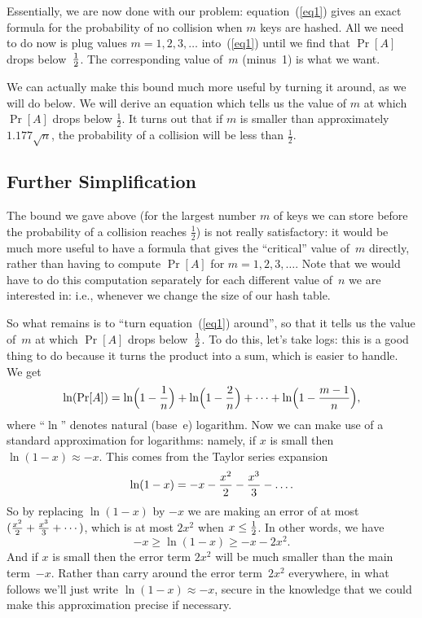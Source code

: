 \documentclass[11pt]{article}
\def\half{{\textstyle{1\over 2}}}
\begin{document}
Essentially, we are now done with our problem: equation~(\ref{eq1}) gives
an exact formula for the probability of no collision when $m$ keys
are hashed.  All we need to do now is plug values $m=1,2,3,\ldots$
into~(\ref{eq1}) until we find that $\Pr[A]$ drops below~$\half$.  The
corresponding value of~$m$ (minus~1) is what we want.  

We can actually make this bound much more useful by turning it around, as we will
do below. We will derive an equation which tells us the value of $m$ at which $\Pr[A]$ drops below
$\frac{1}{2}$. It turns out that if $m$ is smaller than approximately
$1.177\sqrt{n}$, the probability of a collision will be less than $\frac{1}{2}$. 

\subsection*{Further Simplification}
The bound we gave above (for the largest number $m$ of keys we can store
before the probability of a collision reaches $\frac{1}{2}$) is not really satisfactory: it would be much more useful to
have a formula that gives the ``critical'' value of~$m$ directly, rather 
than having to compute $\Pr[A]$ for $m=1,2,3,\ldots$.  Note that we
would have to do this computation separately for each different value
of~$n$ we are interested in: i.e., whenever we change the size of our 
hash table.

So what remains is to ``turn equation~(\ref{eq1}) around'', 
so that it tells us the 
value of~$m$ at which $\Pr[A]$ drops below~$\half$.  To do this, let's
take logs: this is a good thing to do because it turns the product into
a sum, which is easier to handle.  We get
\begin{equation}\label{eq2}
   \ln(\Pr[A]) = \ln\Bigl(1-{1\over n}\Bigr) + 
                 \ln\Bigl(1-{2\over n}\Bigr) + \cdots +
                 \ln\Bigl(1-{{m-1}\over n}\Bigr),
\end{equation}
where ``$\ln$'' denotes natural (base~e) logarithm.  Now we can make use
of a standard approximation for logarithms: namely, if $x$ is small
then $\ln(1-x)\approx -x$.  This comes from the Taylor series expansion $$
   \ln(1-x) = -x -{{x^2}\over 2} -{{x^3}\over 3} - \ldots.  $$
So by replacing $\ln(1-x)$ by $-x$ we are making an error of at most
$({{x^2}\over 2}+{{x^3}\over 3}+\cdots)$, which is at most $2x^2$
when $x\le\half$.  In other words, we have $$
    -x \ge \ln(1-x) \ge -x -2x^2.  $$
And if $x$ is small then the error term $2x^2$ will be
much smaller than the main term~$-x$.
Rather than carry around the error term~$2x^2$ everywhere,
in what follows we'll just write $\ln(1-x)\approx -x$, secure in the
knowledge that we could make this approximation precise if necessary.
\end{document}
